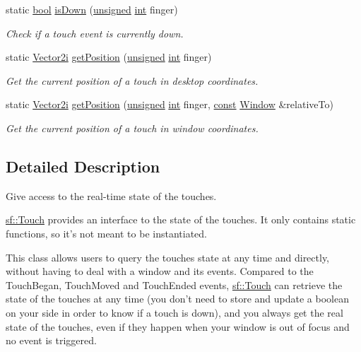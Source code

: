 \begin{DoxyCompactItemize}
static \hyperlink{term__entry_8h_a002004ba5d663f149f6c38064926abac}{bool} \hyperlink{classsf_1_1_touch_a2f85297123ea4e401d02c346e50d48a3}{is\-Down} (\hyperlink{curses_8priv_8h_aca40206900cfc164654362fa8d4ad1e6}{unsigned} \hyperlink{term__entry_8h_ad65b480f8c8270356b45a9890f6499ae}{int} finger)
\begin{DoxyCompactList}\small\item\em Check if a touch event is currently down. \end{DoxyCompactList}\item 
static \hyperlink{namespacesf_a0eed58bf66694ebbc55f72ca7de840d9}{Vector2i} \hyperlink{classsf_1_1_touch_af1b7035be709091c7475075e43e2bc23}{get\-Position} (\hyperlink{curses_8priv_8h_aca40206900cfc164654362fa8d4ad1e6}{unsigned} \hyperlink{term__entry_8h_ad65b480f8c8270356b45a9890f6499ae}{int} finger)
\begin{DoxyCompactList}\small\item\em Get the current position of a touch in desktop coordinates. \end{DoxyCompactList}\item 
static \hyperlink{namespacesf_a0eed58bf66694ebbc55f72ca7de840d9}{Vector2i} \hyperlink{classsf_1_1_touch_a372acaba3c7ac70fca4614c16ac4a1bb}{get\-Position} (\hyperlink{curses_8priv_8h_aca40206900cfc164654362fa8d4ad1e6}{unsigned} \hyperlink{term__entry_8h_ad65b480f8c8270356b45a9890f6499ae}{int} finger, \hyperlink{term__entry_8h_a57bd63ce7f9a353488880e3de6692d5a}{const} \hyperlink{classsf_1_1_window}{Window} \&relative\-To)
\begin{DoxyCompactList}\small\item\em Get the current position of a touch in window coordinates. \end{DoxyCompactList}\end{DoxyCompactItemize}


\subsection{Detailed Description}
Give access to the real-\/time state of the touches. 

\hyperlink{classsf_1_1_touch}{sf\-::\-Touch} provides an interface to the state of the touches. It only contains static functions, so it's not meant to be instantiated.

This class allows users to query the touches state at any time and directly, without having to deal with a window and its events. Compared to the Touch\-Began, Touch\-Moved and Touch\-Ended events, \hyperlink{classsf_1_1_touch}{sf\-::\-Touch} can retrieve the state of the touches at any time (you don't need to store and update a boolean on your side in order to know if a touch is down), and you always get the real state of the touches, even if they happen when your window is out of focus and no event is triggered.

